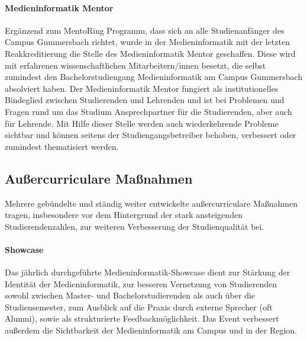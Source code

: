 \paragraph{Medieninformatik
Mentor\label{/mi-2017/selbstbericht/0100-ist-zustand/0100-ist-zustand}}\label{medieninformatik-mentorpathlabelmi-2017selbstbericht0100-ist-zustand0100-ist-zustand}

Ergänzend zum MentoRing Programm, dass sich an alle Studienanfänger des
Campus Gummersbach richtet, wurde in der Medieninformatik mit der
letzten Reakkreditierung die Stelle des Medieninformatik Mentor
geschaffen. Diese wird mit erfahrenen wissenschaftlichen
Mitarbeitern/innen besetzt, die selbst zumindest den Bachelorstudiengang
Medieninformatik am Campus Gummersbach absolviert haben. Der
Medieninformatik Mentor fungiert als institutionelles Bindeglied
zwischen Studierenden und Lehrenden und ist bei Problemen und Fragen
rund um das Studium Ansprechpartner für die Studierenden, aber auch für
Lehrende. Mit Hilfe dieser Stelle werden auch wiederkehrende Probleme
sichtbar und können seitens der Studiengangsbetreiber behoben,
verbessert oder zumindest thematisiert werden.

\subsection{Außercurriculare
Maßnahmen\label{/mi-2017/selbstbericht/0100-ist-zustand/0100-ist-zustand}}\label{auuxdfercurriculare-mauxdfnahmenpathlabelmi-2017selbstbericht0100-ist-zustand0100-ist-zustand}

Mehrere gebündelte und ständig weiter entwickelte außercurriculare
Maßnahmen tragen, insbesondere vor dem Hintergrund der stark
ansteigenden Studierendenzahlen, zur weiteren Verbesserung der
Studienqualität bei.

\paragraph{Showcase
\label{/mi-2017/selbstbericht/0100-ist-zustand/0100-ist-zustand}}\label{showcase-pathlabelmi-2017selbstbericht0100-ist-zustand0100-ist-zustand}

Das jährlich durchgeführte Medieninformatik-Showcase dient zur Stärkung
der Identität der Medieninformatik, zur besseren Vernetzung von
Studierenden sowohl zwischen Master- und Bachelorstudierenden als auch
über die Studiensemester, zum Ausblick auf die Praxis durch externe
Sprecher (oft Alumni), sowie als strukturierte Feedbackmöglichkeit. Das
Event verbessert außerdem die Sichtbarkeit der Medieninformatik am
Campus und in der Region.

